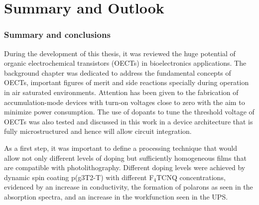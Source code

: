 \chapter{Summary and Outlook}
\label{cha:conclusion}

\subsection{Summary and conclusions}

During the development of this thesis, it was reviewed the huge potential of organic electrochemical transistors (OECTs) in bioelectronics applications. The background chapter was dedicated to address the fundamental concepts of OECTs, important figures of merit and side reactions specially during operation in air saturated environments. Attention has been given to the fabrication of accumulation-mode devices with turn-on voltages close to zero with the aim to minimize power consumption. The use of dopants to tune the threshold voltage of OECTs was also tested and discussed in this work in a device architecture that is fully microstructured and hence will allow circuit integration. 

As a first step, it was important to define a processing technique that would allow not only different levels of doping but sufficiently homogeneous films that are compatible with photolithography. Different doping levels were achieved by dynamic spin coating p(g3T2-T) with different F$_{4}$TCNQ concentrations, evidenced by an increase in conductivity, the formation of polarons as seen in the absorption spectra, and an increase in the workfunction seen in the UPS. 


